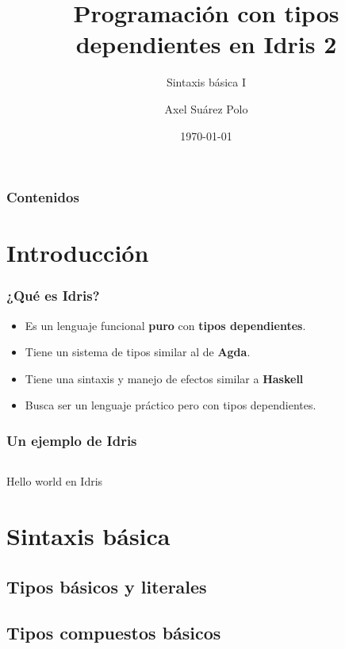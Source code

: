 \documentclass{beamer}
\title{Programación con tipos dependientes en Idris 2}
\subtitle{Sintaxis básica I}
\author{Axel Suárez Polo}
\institute{BUAP}
\date{\today}
\begin{document}
\begin{frame}
  \titlepage
\end{frame}

\begin{frame}[t]
  \frametitle{Contenidos}
  \tableofcontents
\end{frame}

\section{Introducción}

\begin{frame}
  \frametitle{¿Qué es Idris?}

  \begin{itemize}
    \item Es un lenguaje funcional \textbf{puro} con \textbf{tipos dependientes}.
    \item Tiene un sistema de tipos similar al de \textbf{Agda}.
    \item Tiene una sintaxis y manejo de efectos similar a \textbf{Haskell}
    \item Busca ser un lenguaje práctico pero con tipos dependientes.
  \end{itemize}
\end{frame}

\begin{frame}[fragile]
  \frametitle{Un ejemplo de Idris}

  \begin{listing}[H]
    \begin{center}
      \begin{minipage}{0.6\textwidth}
        \inputminted{idris}{code/helloworld.idr}
      \end{minipage}
    \end{center}
    \caption{Hello world en Idris}
    \label{lst:helloworld}
  \end{listing}
\end{frame}

\section{Sintaxis básica}
\subsection{Tipos básicos y literales}
\subsection{Tipos compuestos básicos}
\end{document}
